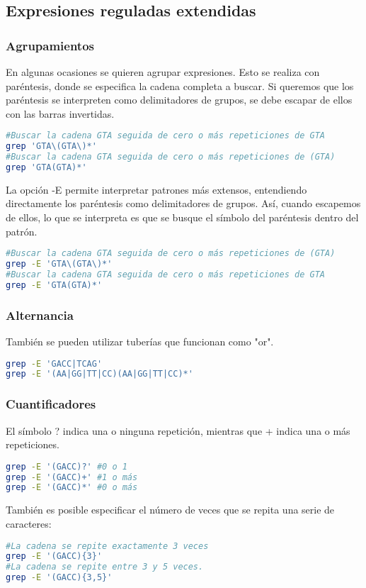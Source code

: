 \subsection{Expresiones reguladas extendidas}
\subsubsection{Agrupamientos}
En algunas ocasiones se quieren agrupar expresiones. Esto se realiza con paréntesis, donde se especifica la cadena completa a buscar. Si queremos que los paréntesis se interpreten como delimitadores de grupos, se debe escapar de ellos con las barras invertidas. 
\begin{lstlisting}[language=bash]
#Buscar la cadena GTA seguida de cero o más repeticiones de GTA
grep 'GTA\(GTA\)*'
#Buscar la cadena GTA seguida de cero o más repeticiones de (GTA)
grep 'GTA(GTA)*'
\end{lstlisting}

La opción -E permite interpretar patrones más extensos, entendiendo directamente los paréntesis como delimitadores de grupos. Así, cuando escapemos de ellos, lo que se interpreta es que se busque el símbolo del paréntesis dentro del patrón.
\begin{lstlisting}[language=bash]
#Buscar la cadena GTA seguida de cero o más repeticiones de (GTA)
grep -E 'GTA\(GTA\)*'
#Buscar la cadena GTA seguida de cero o más repeticiones de GTA
grep -E 'GTA(GTA)*'
\end{lstlisting}

\subsubsection{Alternancia}
También se pueden utilizar tuberías que funcionan como "or". 
\begin{lstlisting}[language=bash]
grep -E 'GACC|TCAG'
grep -E '(AA|GG|TT|CC)(AA|GG|TT|CC)*'
\end{lstlisting}

\subsubsection{Cuantificadores}
El símbolo ? indica una o ninguna repetición, mientras que + indica una o más repeticiones.
\begin{lstlisting}[language=bash]
grep -E '(GACC)?' #0 o 1
grep -E '(GACC)+' #1 o más
grep -E '(GACC)*' #0 o más
\end{lstlisting}

También es posible especificar el número de veces que se repita una serie de caracteres:
\begin{lstlisting}[language=bash]
#La cadena se repite exactamente 3 veces
grep -E '(GACC){3}'
#La cadena se repite entre 3 y 5 veces.
grep -E '(GACC){3,5}'
\end{lstlisting}

